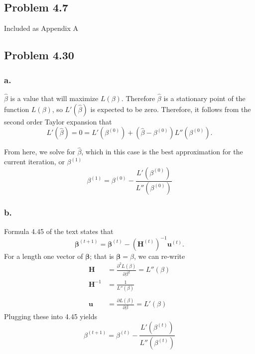\documentclass{article}
\begin{document}
\subsection{Problem 4.7}

Included as Appendix A

\subsection{Problem 4.30}
\subsubsection{a.}
$\hat{\beta}$ is a value that will maximize $L(\beta)$. Therefore $\hat{\beta}$ is a stationary point of the function $L(\beta)$, so $L'(\hat{\beta})$ is expected to be zero. Therefore, it follows from the second order Taylor expansion that \[L'(\hat{\beta}) = 0 = L'\left(\beta^{(0)}\right) + \left(\hat{\beta}-\beta^{(0)}\right)L''\left(\beta^{(0)}\right).\] 

From here, we solve for $\hat{\beta}$, which in this case is the best approximation for the current iteration, or $\beta^{(1)}$
\[\beta^{(1)} = \beta^{(0)} - \frac{L'\left(\beta^{(0)}\right)}{L''\left(\beta^{(0)}\right)}\]
\subsubsection{b.}
Formula 4.45 of the text states that
\[\bm{\beta}^{(t+1)} = \bm{\beta}^{(t)}-\left(\bm{H}^{(t)}\right)^{-1}\bm{u}^{(t)}.\]
For a length one vector of $\bm{\beta}$; that is $\bm{\beta}=\beta$, we can re-write 
\begin{align*}
\bm{H} &= \frac{\partial^2L(\beta)}{\partial\beta^2} = L''(\beta)\\
\bm{H}^{-1} &= \frac{1}{L''(\beta)} \\ \\
\bm{u} &= \frac{\partial L(\beta)}{\partial\beta} = L'(\beta)
\end{align*}
Plugging these into 4.45 yields
\[\beta^{(t+1)} = \beta^{(t)} - \frac{L'(\beta^{(t)})}{L''(\beta^{(t)})}\]
\end{document}
